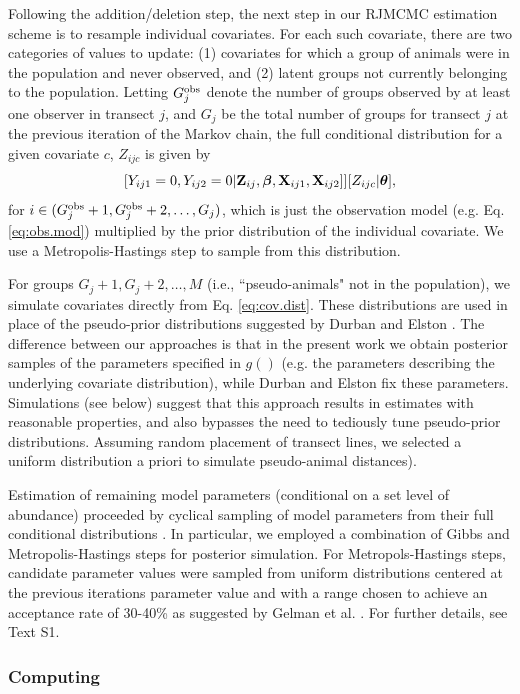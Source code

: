 \documentclass[10pt]{article}
\begin{document}
Following the addition/deletion step, the next step in our RJMCMC estimation scheme is to resample individual covariates.  For each such covariate, there are two categories of values to update: (1) covariates for which a group of animals were in the population and never observed, and (2) latent groups not currently belonging to the population. Letting $G_j^{\rm obs}$ denote the number of groups observed by at least one observer in transect $j$, and $G_j$ be the total number of groups for transect $j$ at the previous iteration of the Markov chain, the full conditional distribution for a given covariate $c$, $Z_{ijc}$ is given by
$$
[Y_{ij1}=0,Y_{ij2}=0|{\bf Z}_{ij},\boldsymbol{\beta},{\bf X}_{ij1},{\bf X}_{ij2}]][Z_{ijc}|\boldsymbol{\theta}],
$$
for $i \in (G_j^{\rm obs}+1,G_{j}^{\rm obs}+2,\hdots,G_j)$,
which is just the observation model (e.g. Eq. \ref{eq:obs.mod}) multiplied by the prior distribution of the individual covariate.  We use a Metropolis-Hastings step to sample from this distribution.

For groups $G_j+1,G_j+2, \hdots,M$ (i.e., ``pseudo-animals" not in the population), we simulate covariates directly from Eq. \ref{eq:cov.dist}.  These distributions are used in place of the pseudo-prior distributions suggested by Durban and Elston \cite{DurbanElston2005}.  The difference between our approaches is that in the present work we obtain posterior samples of the parameters specified in  $g()$ (e.g. the parameters describing the underlying covariate distribution), while Durban and Elston fix these parameters.  Simulations (see below) suggest that this approach results in estimates with reasonable properties, and also bypasses the need to tediously tune pseudo-prior distributions.  Assuming random placement of transect lines, we selected a uniform distribution a priori to simulate pseudo-animal distances).

Estimation of remaining model parameters (conditional on a set level of abundance)  proceeded by cyclical sampling of model parameters from their full conditional distributions \cite{GelmanEtAl2004}.  In particular, we employed a combination of Gibbs and Metropolis-Hastings steps for posterior simulation.  For Metropols-Hastings steps, candidate parameter values were sampled from uniform distributions centered at the previous iterations parameter value and with a range chosen to achieve an acceptance rate of 30-40\% as suggested by Gelman et al. \cite{GelmanEtAl2004}.  For further details, see Text S1.

\subsubsection*{Computing}
\end{document}
